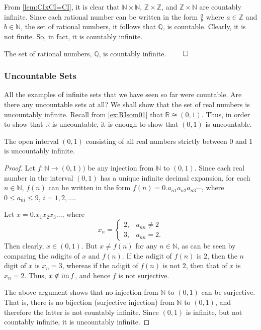 From \cref{lem:CIxCI=CI}, it is clear that $\mathbb N \times \mathbb N$, $\mathbb Z \times \mathbb Z$, and $\mathbb Z \times \mathbb N$ are countably infinite. Since each rational number can be written in the form $\frac a b$ where $a \in \mathbb Z$ and $b \in \mathbb N$, the set of rational numbers, it follows that $\mathbb Q$, is countable. Clearly, it is not finite. So, in fact, it is countably infinite. 

\begin{Theorem}
The set of rational numbers, $\mathbb Q$, is countably infinite. \hfill $\qed$
\end{Theorem}

\subsubsection{Uncountable Sets}\label{subsec:UncountableSets}
All the examples of infinite sets that we have seen so far were countable. Are there any uncountable sets at all? We shall show that the set of real numbers is uncountably infinite. Recall from \cref{ex:RIsom01} that $\mathbb R \cong (0, 1)$. Thus, in order to show that $\mathbb R$ is uncountable, it is enough to show that $(0, 1)$ is uncountable.

\begin{Theorem}
The open interval $(0, 1)$ consisting of all real numbers strictly between $0$ and $1$ is uncountably infinite.
\end{Theorem}

\begin{proof}
Let $f \colon \mathbb N \to (0, 1))$ be any injection from $\mathbb N$ to $(0, 1)$. Since each real number in the interval $(0, 1)$ has a unique infinite decimal expansion, for each $n \in \mathbb N$, $f(n)$ can be written in the form $f(n) = 0.a_{n1} a_{n2} a_{n3} \cdots$, where $0 \le a_{ni} \le 9$, $i = 1, 2, \ldots$.

Let $x = 0.x_1 x_2 x_3 \ldots$, where
\begin{equation*}
x_n = \begin{cases}
2, & a_{nn} \ne 2 \\
3, & a_{nn} = 2.
\end{cases}
\end{equation*}
Then clearly, $x \in (0, 1)$. But $x \ne f(n)$ for any $n \in \mathbb N$, as can be seen by comparing the $n$\nth digits of $x$ and $f(n)$. If the $n$\nth digit of $f(n)$ is $2$, then the $n$\nth digit of $x$ is $x_n = 3$, whereas if the $n$\nth digit of $f(n)$ is not $2$, then that of $x$ is $x_n = 2$. Thus, $x \notin \operatorname{im} f$, and hence $f$ is not surjective.

The above argument shows that no injection from $\mathbb N$ to $(0, 1)$ can be surjective. That is, there is no bijection (surjective injection) from $\mathbb N$ to $(0, 1)$, and therefore the latter is not countably infinite. Since $(0, 1)$ is infinite, but not countably infinite, it is uncountably infinite.
\end{proof}

